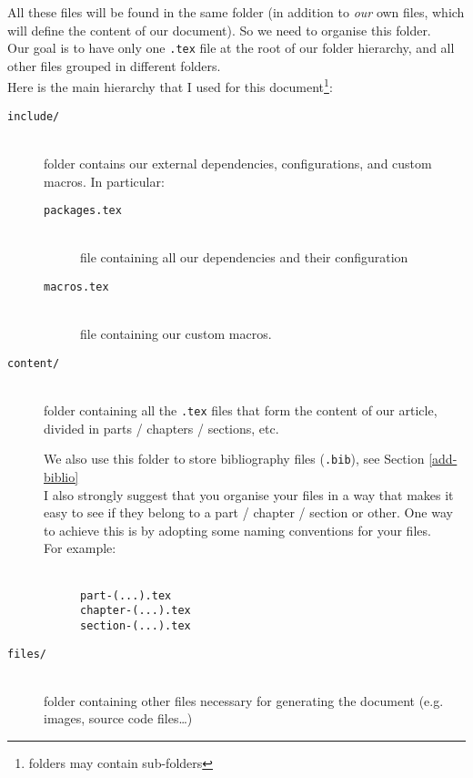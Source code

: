 All these files will be found in the same folder (in addition to \emph{our} own files, which will define the content of our document). So we need to organise this folder. \\

Our goal is to have only one \texttt{.tex} file at the root of our folder hierarchy, and all other files grouped in different folders. \\

Here is the main hierarchy that I used for this document\footnote{folders may contain sub-folders}:
\begin{description}
	\item[\texttt{include/}] \mbox{} \\
	folder contains our external dependencies, configurations, and custom macros.
	In particular:
	\begin{description}
		\item[\texttt{packages.tex}] \mbox{} \\
		file containing all our dependencies and their configuration
		\item[\texttt{macros.tex}] \mbox{} \\
		file containing our custom macros.
	\end{description}

	\item[\texttt{content/}] \mbox{} \\
	folder containing all the \texttt{.tex} files that form the content of our article,
	divided in parts / chapters / sections, etc.
	
	We also use this folder to store bibliography files (\texttt{.bib}), see Section \ref{add-biblio} \\
	
	I also strongly suggest that you organise your files in a way that makes it easy to see if they belong to a part / chapter / section or other. One way to achieve this is by adopting some naming conventions for your files. \\
	
	For example:
	\begin{description}
	\item[] \mbox{} \\
		\texttt{part-(...).tex\\
		chapter-(...).tex\\
		section-(...).tex}
	\end{description}


	\item[\texttt{files/}] \mbox{} \\
	folder containing other files necessary for generating the document (e.g. images, source code files\dots)
\end{description}

